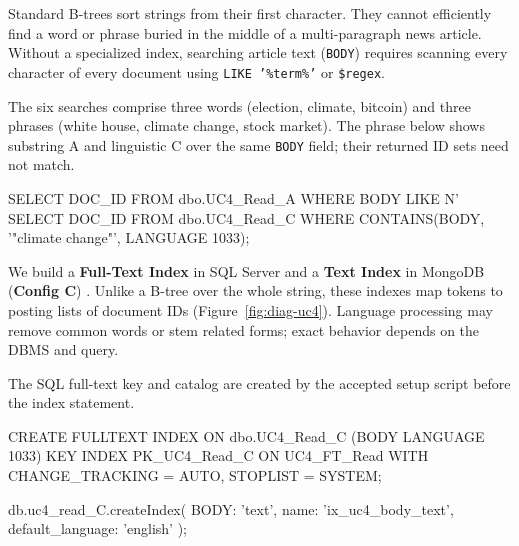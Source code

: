 Standard B-trees sort strings from their first character. They cannot efficiently find a word or phrase buried in the middle of a multi-paragraph news article. Without a specialized index, searching article text (\texttt{BODY}) requires scanning every character of every document using \texttt{LIKE '\%term\%'} or \texttt{\$regex}.

The six searches comprise three words (election, climate, bitcoin) and three phrases (white house, climate change, stock market). The phrase below shows substring A and linguistic C over the same \texttt{BODY} field; their returned ID sets need not match.
\begin{SQLCode}
SELECT DOC_ID FROM dbo.UC4_Read_A
WHERE BODY LIKE N'%
SELECT DOC_ID FROM dbo.UC4_Read_C
WHERE CONTAINS(BODY, '"climate change"', LANGUAGE 1033);
\end{SQLCode}

We build a \textbf{Full-Text Index} in SQL Server and a \textbf{Text Index} in MongoDB (\textbf{Config C}) \cite{mssqlfts,mongotext}. Unlike a B-tree over the whole string, these indexes map tokens to posting lists of document IDs (Figure~\ref{fig:diag-uc4}). Language processing may remove common words or stem related forms; exact behavior depends on the DBMS and query.

The SQL full-text key and catalog are created by the accepted setup script before the index statement.
\begin{SQLCode}
CREATE FULLTEXT INDEX ON dbo.UC4_Read_C (BODY LANGUAGE 1033)
KEY INDEX PK_UC4_Read_C ON UC4_FT_Read
WITH CHANGE_TRACKING = AUTO, STOPLIST = SYSTEM;
\end{SQLCode}
\begin{MongoCode}
db.uc4_read_C.createIndex(
  {BODY: 'text'},
  {name: 'ix_uc4_body_text', default_language: 'english'}
);
\end{MongoCode}

